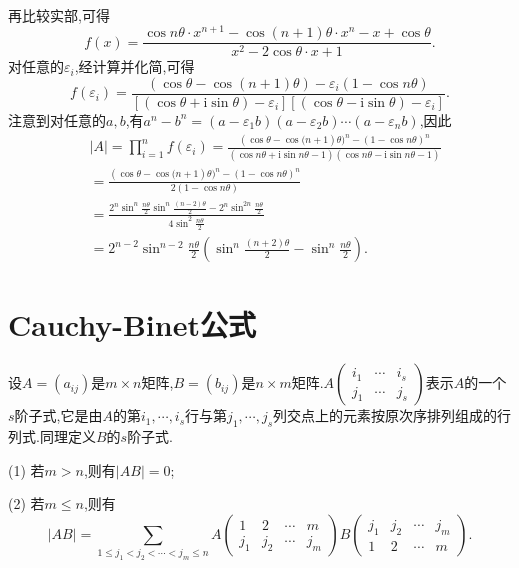 \documentclass[lang=cn,newtx,10pt,scheme=chinese]{elegantbook}
\begin{document}
\begin{solution}
\begin{align*}
\end{align*}
再比较实部,可得
\[
f(x)=\frac{\cos n\theta\cdot x^{n + 1}-\cos(n + 1)\theta\cdot x^n - x+\cos\theta}{x^2 - 2\cos\theta\cdot x + 1}.
\]
对任意的\(\varepsilon_i\),经计算并化简,可得
\[
f(\varepsilon _i)=\frac{\left( \cos \theta -\cos \left( n+1 \right) \theta \right) -\varepsilon _i\left( 1-\cos n\theta \right)}{\left[ \left( \cos \theta +\mathrm{i}\sin \theta \right) -\varepsilon _i \right] \left[ \left( \cos \theta -\mathrm{i}\sin \theta \right) -\varepsilon _i \right]}.
\]
注意到对任意的\(a,b\),有\(a^n - b^n=(a - \varepsilon_1b)(a - \varepsilon_2b)\cdots(a - \varepsilon_nb)\),因此
\begin{align*}
    &\left| A \right|=\prod_{i=1}^n{f(\varepsilon _i)}=\frac{(\cos \theta -\cos\mathrm{(}n+1)\theta )^n-(1-\cos n\theta )^n}{(\cos n\theta +\mathrm{i}\sin n\theta -1)(\cos n\theta -\mathrm{i}\sin n\theta -1)}
    \\
    &=\frac{(\cos \theta -\cos\mathrm{(}n+1)\theta )^n-(1-\cos n\theta )^n}{2(1-\cos n\theta )}
    \\
    &=\frac{2^n\sin ^n\frac{n\theta}{2}\sin ^n\frac{\left( n-2 \right) \theta}{2}-2^n\sin ^{2n}\frac{n\theta}{2}}{4\sin ^2\frac{n\theta}{2}}
    \\
    &=2^{n-2}\sin ^{n-2}\frac{n\theta}{2}\left( \sin ^n\frac{(n+2)\theta}{2}-\sin ^n\frac{n\theta}{2} \right) .
\end{align*}
\end{solution}

\section{Cauchy-Binet公式}

\begin{theorem}\label{theorem:Cauchy-Binet公式}
    设\(A=(a_{ij})\)是\(m\times n\)矩阵,\(B=(b_{ij})\)是\(n\times m\)矩阵.\(A\left(\begin{matrix}
    i_1 & \cdots & i_s\\
    j_1 & \cdots & j_s
    \end{matrix}\right)\)表示\(A\)的一个\(s\)阶子式,它是由\(A\)的第\(i_1,\cdots,i_s\)行与第\(j_1,\cdots,j_s\)列交点上的元素按原次序排列组成的行列式.同理定义\(B\)的\(s\)阶子式.
    
    (1) 若\(m > n\),则有\(\vert AB\vert=0\);
    
    (2) 若\(m\leq n\),则有
    \[\vert AB\vert=\sum_{1\leq j_1<j_2<\cdots<j_m\leq n}A\left(\begin{matrix}
    1 & 2 & \cdots & m\\
    j_1 & j_2 & \cdots & j_m
    \end{matrix}\right)B\left(\begin{matrix}
    j_1 & j_2 & \cdots & j_m\\
    1 & 2 & \cdots & m
    \end{matrix}\right).\]
    \end{theorem}
    
\end{document}
